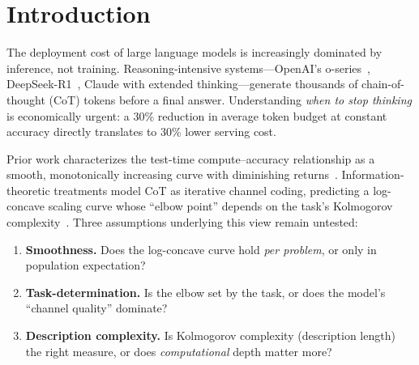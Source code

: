 \documentclass{article}
\begin{document}
\begin{abstract}
\textbf{(3)}~At the per-problem level, an oracle-best routing policy that picks the smallest budget at which each problem first succeeds saves $36.4\%$ of tokens against the max budget while maintaining or improving accuracy (mean $+3.4$pp, $90\%$ CI $[0.4, 6.4]$pp).  The gzip routing-proxy overhead is $0.037$\,ms p99 against $12.4$\,s p99 end-to-end inference latency---a negligible $0.0003\%$.  Learned routing is future work; we report the oracle bound.
Together these results reframe how the field should think about test-time scaling: smoothness is a population-averaging artifact, not a per-problem law, and exploiting per-problem discreteness yields substantial inference-cost savings while remaining honest about the regimes in which the BIC machinery has signal vs.\ noise to fit.
\end{abstract}

\section{Introduction}
\label{sec:intro}

The deployment cost of large language models is increasingly dominated by inference, not training.  Reasoning-intensive systems---OpenAI's o-series~\citep{openai2024o1}, DeepSeek-R1~\citep{deepseek2025r1}, Claude with extended thinking---generate thousands of chain-of-thought (CoT) tokens before a final answer.  Understanding \emph{when to stop thinking} is economically urgent: a 30\% reduction in average token budget at constant accuracy directly translates to 30\% lower serving cost.

Prior work characterizes the test-time compute--accuracy relationship as a smooth, monotonically increasing curve with diminishing returns~\citep{snell2024scaling,kaplan2020scaling}.  Information-theoretic treatments model CoT as iterative channel coding, predicting a log-concave scaling curve whose ``elbow point'' depends on the task's Kolmogorov complexity~\citep{polyanskiy2024it}.  Three assumptions underlying this view remain untested:

\begin{enumerate}[leftmargin=*,itemsep=2pt]
    \item \textbf{Smoothness.}  Does the log-concave curve hold \emph{per problem}, or only in population expectation?
    \item \textbf{Task-determination.}  Is the elbow set by the task, or does the model's ``channel quality'' dominate?
    \item \textbf{Description complexity.}  Is Kolmogorov complexity (description length) the right measure, or does \emph{computational} depth matter more?
\end{enumerate}
\end{document}
